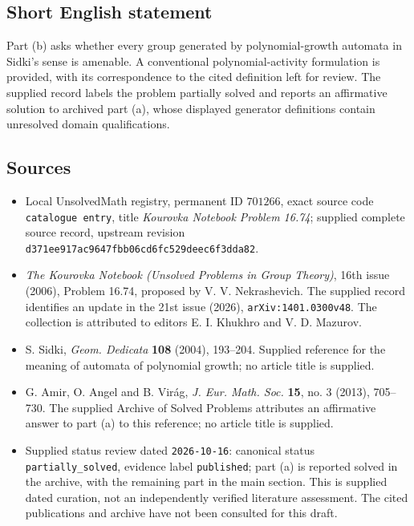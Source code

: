 \documentclass[11pt]{article}
\begin{document}
\subsection{Short English statement}
Part (b) asks whether every group generated by polynomial-growth automata in Sidki's sense is amenable. A conventional polynomial-activity formulation is provided, with its correspondence to the cited definition left for review. The supplied record labels the problem partially solved and reports an affirmative solution to archived part (a), whose displayed generator definitions contain unresolved domain qualifications.
\subsection{Sources}
\begin{itemize}
\item Local UnsolvedMath registry, permanent ID \(701266\), exact source code \texttt{catalogue entry}, title \emph{Kourovka Notebook Problem 16.74}; supplied complete source record, upstream revision \texttt{d371ee917ac9647fbb06cd6fc529deec6f3dda82}.
\item \emph{The Kourovka Notebook (Unsolved Problems in Group Theory)}, 16th issue (2006), Problem 16.74, proposed by V. V. Nekrashevich. The supplied record identifies an update in the 21st issue (2026), \texttt{arXiv:1401.0300v48}. The collection is attributed to editors E. I. Khukhro and V. D. Mazurov.
\item S. Sidki, \emph{Geom. Dedicata} \textbf{108} (2004), 193--204. Supplied reference for the meaning of automata of polynomial growth; no article title is supplied.
\item G. Amir, O. Angel and B. Vir\'ag, \emph{J. Eur. Math. Soc.} \textbf{15}, no. 3 (2013), 705--730. The supplied Archive of Solved Problems attributes an affirmative answer to part (a) to this reference; no article title is supplied.
\item Supplied status review dated \texttt{2026-10-16}: canonical status \texttt{partially\_solved}, evidence label \texttt{published}; part (a) is reported solved in the archive, with the remaining part in the main section. This is supplied dated curation, not an independently verified literature assessment. The cited publications and archive have not been consulted for this draft.
\end{itemize}
\end{document}
